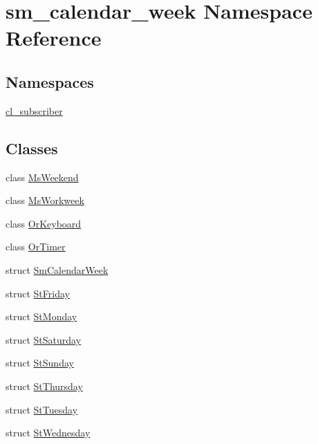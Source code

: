 \hypertarget{namespacesm__calendar__week}{}\section{sm\+\_\+calendar\+\_\+week Namespace Reference}
\label{namespacesm__calendar__week}
\subsection*{Namespaces}
\begin{DoxyCompactItemize}
\item 
 \hyperlink{namespacesm__calendar__week_1_1cl__subscriber}{cl\+\_\+subscriber}
\end{DoxyCompactItemize}
\subsection*{Classes}
\begin{DoxyCompactItemize}
\item 
class \hyperlink{classsm__calendar__week_1_1MsWeekend}{Ms\+Weekend}
\item 
class \hyperlink{classsm__calendar__week_1_1MsWorkweek}{Ms\+Workweek}
\item 
class \hyperlink{classsm__calendar__week_1_1OrKeyboard}{Or\+Keyboard}
\item 
class \hyperlink{classsm__calendar__week_1_1OrTimer}{Or\+Timer}
\item 
struct \hyperlink{structsm__calendar__week_1_1SmCalendarWeek}{Sm\+Calendar\+Week}
\item 
struct \hyperlink{structsm__calendar__week_1_1StFriday}{St\+Friday}
\item 
struct \hyperlink{structsm__calendar__week_1_1StMonday}{St\+Monday}
\item 
struct \hyperlink{structsm__calendar__week_1_1StSaturday}{St\+Saturday}
\item 
struct \hyperlink{structsm__calendar__week_1_1StSunday}{St\+Sunday}
\item 
struct \hyperlink{structsm__calendar__week_1_1StThursday}{St\+Thursday}
\item 
struct \hyperlink{structsm__calendar__week_1_1StTuesday}{St\+Tuesday}
\item 
struct \hyperlink{structsm__calendar__week_1_1StWednesday}{St\+Wednesday}
\end{DoxyCompactItemize}
